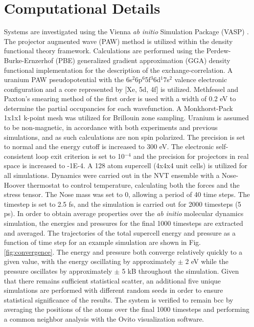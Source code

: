 \documentclass[review]{elsarticle}
\begin{document}
\section{Computational Details}
Systems are investigated using the Vienna \textit{ab initio} Simulation Package (VASP) \cite{vasp1, vasp2, vasp3, vasp4}. The projector augmented wave (PAW) method \cite{paw1, paw2} is utilized within the density functional theory \cite{dft1, dft2} framework. Calculations are performed using the Perdew-Burke-Ernzerhof (PBE) \cite{pbe1, pbe2} generalized gradient approximation (GGA) density functional implementation for the description of the exchange-correlation. A uranium PAW pseudopotential with the 6s$^{2}$6p$^{6}$5f$^{3}$6d$^{1}$7s$^{2}$ valence electronic configuration and a core represented by [Xe, 5d, 4f] is utilized. Methfessel and Paxton's smearing method \cite{methfessel} of the first order is used with a width of 0.2 eV to determine the partial occupancies for each wavefunction. A Monkhorst-Pack \cite{monkhorst} 1x1x1 k-point mesh was utilized for Brillouin zone sampling. Uranium is assumed to be non-magnetic, in accordance with both experiments and previous simulations, and as such calculations are non spin polarized. The precision is set to normal and the energy cutoff is increased to 300 eV. The electronic self-consistent loop exit criterion is set to 10$^{-4}$ and the precision for projectors in real space is increased to -1E-4. A 128 atom supercell (4x4x4 unit cells) is utilized for all simulations. Dynamics were carried out in the NVT ensemble with a Nose-Hoover thermostat to control temperature, calculating both the forces and the stress tensor. The Nose mass was set to 0, allowing a period of 40 time steps. The timestep is set to 2.5 fs, and the simulation is carried out for 2000 timesteps (5 ps). In order to obtain average properties over the \textit{ab initio} molecular dynamics simulation, the energies and pressures for the final 1000 timesteps are extracted and averaged. The trajectories of the total supercell energy and pressure as a function of time step for an example simulation are shown in Fig. \ref{fig:convergence}. The energy and pressure both converge relatively quickly to a given value, with the energy oscillating by approximately $\pm$ 2 eV while the pressure oscillates by approximately $\pm$ 5 kB throughout the simulation. Given that there remains sufficient statistical scatter, an additional five unique simulations are performed with different random seeds in order to ensure statistical significance of the results. The system is verified to remain bcc by averaging the positions of the atoms over the final 1000 timesteps and performing a common neighbor analysis with the Ovito \cite{ovito} visualization software. 
\end{document}
